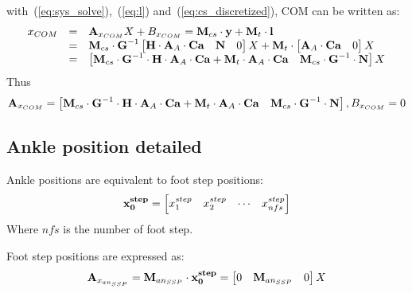 \documentclass[journal]{IEEEtran}
\begin{document}
with~(\ref{eq:sys_solve}),~(\ref{eq:l}) and~(\ref{eq:cs_discretized}), COM can be written as:
\begin{equation}
\begin{array}{lll}
x_{\mbox{\tiny COM}} &=& \mathbf{A}_{x_{\mbox{\tiny COM}}} X + B_{x_{\mbox{\tiny COM}}} = \textbf{M}_{cs}\cdot\mathbf{y}+\mathbf{M}_t\cdot\mathbf{l}\\
&=&\textbf{M}_{cs}\cdot\textbf{G}^{-1}\begin{bmatrix}
\mathbf{H}\cdot\mathbf{A}_A \cdot\mathbf{Ca} & \mathbf{N} & 0
\end{bmatrix}X + \mathbf{M}_t\cdot\begin{bmatrix} \mathbf{A}_A\cdot\mathbf{Ca} & 0 \end{bmatrix} X\\
&=&\begin{bmatrix}
\textbf{M}_{cs}\cdot\textbf{G}^{-1}\cdot\mathbf{H}\cdot\mathbf{A}_A \cdot\mathbf{Ca}+\mathbf{M}_t\cdot\mathbf{A}_A\cdot\mathbf{Ca} & \textbf{M}_{cs}\cdot\textbf{G}^{-1}\cdot\mathbf{N}
\end{bmatrix}X
\end{array}
\end{equation}
Thus
\begin{equation}
\begin{matrix}
\mathbf{A}_{x_{\mbox{\tiny COM}}}=\begin{bmatrix}
\textbf{M}_{cs}\cdot\textbf{G}^{-1}\cdot\mathbf{H}\cdot\mathbf{A}_A \cdot\mathbf{Ca}+\mathbf{M}_t\cdot\mathbf{A}_A\cdot\mathbf{Ca} & \textbf{M}_{cs}\cdot\textbf{G}^{-1}\cdot\mathbf{N}
\end{bmatrix}, B_{x_{\mbox{\tiny COM}}}=0
\end{matrix}
\end{equation}

\subsection{Ankle position detailed}
Ankle positions are equivalent to foot step positions:
\begin{equation}
\mathbf{x^{\mbox{\tiny step}}_0}=\begin{bmatrix}
x^{\mbox{\tiny step}}_1 & x^{\mbox{\tiny step}}_2 & \cdots & x^{\mbox{\tiny step}}_{nfs}
\end{bmatrix}
\end{equation}
Where $nfs$ is the number of foot step.

Foot step positions are expressed as:
\begin{equation}
\mathbf{A}_{x_{an_{SSP}}}=\mathbf{M}_{an_{SSP}}\cdot\mathbf{x^{\mbox{\tiny step}}_0}=
\begin{bmatrix}
0 & \mathbf{M}_{an_{SSP}} & 0
\end{bmatrix} X
\end{equation}
\end{document}
